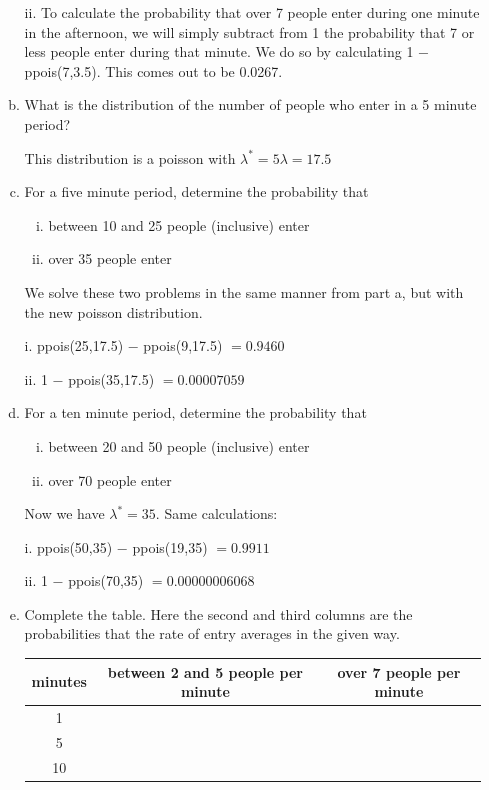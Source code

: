 \documentclass{scrartcl}
\begin{document}
\begin{enumerate}
\begin{enumerate}[a)]
  ii. To calculate the probability that over 7 people enter during one minute in the afternoon, we will simply subtract from 1 the probability that 7 or less people enter during that minute. We do so by calculating 1 $-$ ppois(7,3.5). This comes out to be 0.0267.\\

\item What is the distribution of the number of people who enter in a 5 minute period?

  This distribution is a poisson with $\lambda^* = 5\lambda = 17.5$\\

\item For a five minute period, determine the probability that
  \begin{enumerate}[i.]
    \item between 10 and 25 people (inclusive) enter
    \item over 35 people enter
  \end{enumerate}

We solve these two problems in the same manner from part a, but with the new poisson distribution.

  i. ppois(25,17.5) $-$ ppois(9,17.5) $=0.9460$
  
  ii. 1 $-$ ppois(35,17.5) $=0.00007059$\\

\item For a ten minute period, determine the probability that
  \begin{enumerate}[i.]
    \item between 20 and 50 people (inclusive) enter
    \item over 70 people enter
  \end{enumerate}
  Now we have $\lambda^* = 35$. Same calculations:

  i. ppois(50,35) $-$ ppois(19,35) $=0.9911$
  
  ii. 1 $-$ ppois(70,35) $=0.00000006068$\\

\item Complete the table. Here the second and third columns are the probabilities that the rate of entry averages in the given way.

\begin{center}
\begin{tabular} { c|c|c }
minutes&between 2 and 5 people per minute&over 7 people per minute\\
\hline
1&&\\
5&&\\
10&&\\
\end{tabular}
\end{center}


\end{enumerate}
\end{enumerate}
\end{document}
